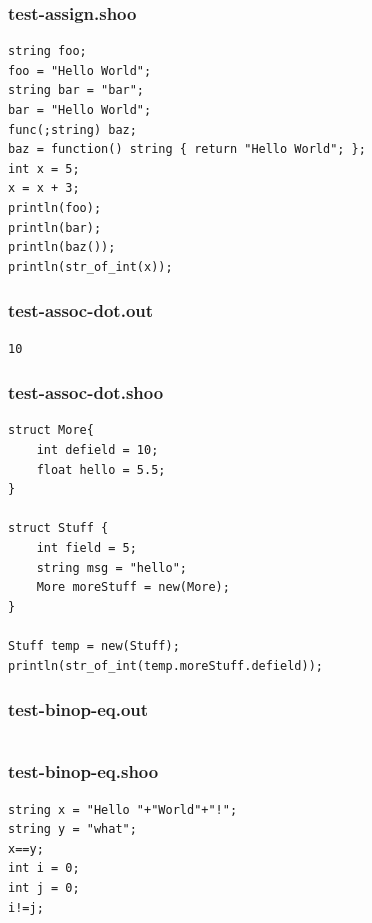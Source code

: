 \documentclass[12pt]{article}
\begin{document}
\subsubsection{test-assign.shoo}
\begin{mdframed}[hidealllines=true,backgroundcolor=blue!10]
\begin{lstlisting}
string foo;
foo = "Hello World";
string bar = "bar";
bar = "Hello World";
func(;string) baz;
baz = function() string { return "Hello World"; };
int x = 5;
x = x + 3;
println(foo);
println(bar);
println(baz());
println(str_of_int(x));\end{lstlisting}
\end{mdframed}
\subsubsection{test-assoc-dot.out}
\begin{mdframed}[hidealllines=true,backgroundcolor=green!10]
\begin{lstlisting}
10\end{lstlisting}
\end{mdframed}
\subsubsection{test-assoc-dot.shoo}
\begin{mdframed}[hidealllines=true,backgroundcolor=blue!10]
\begin{lstlisting}
struct More{
	int defield = 10;
	float hello = 5.5;
}

struct Stuff {
	int field = 5;
	string msg = "hello";
	More moreStuff = new(More);
}

Stuff temp = new(Stuff);
println(str_of_int(temp.moreStuff.defield));\end{lstlisting}
\end{mdframed}
\subsubsection{test-binop-eq.out}
\begin{mdframed}[hidealllines=true,backgroundcolor=green!10]
\begin{lstlisting}
\end{lstlisting}
\end{mdframed}
\subsubsection{test-binop-eq.shoo}
\begin{mdframed}[hidealllines=true,backgroundcolor=blue!10]
\begin{lstlisting}
string x = "Hello "+"World"+"!";
string y = "what";
x==y;
int i = 0;
int j = 0;
i!=j;\end{lstlisting}
\end{mdframed}
\end{document}
